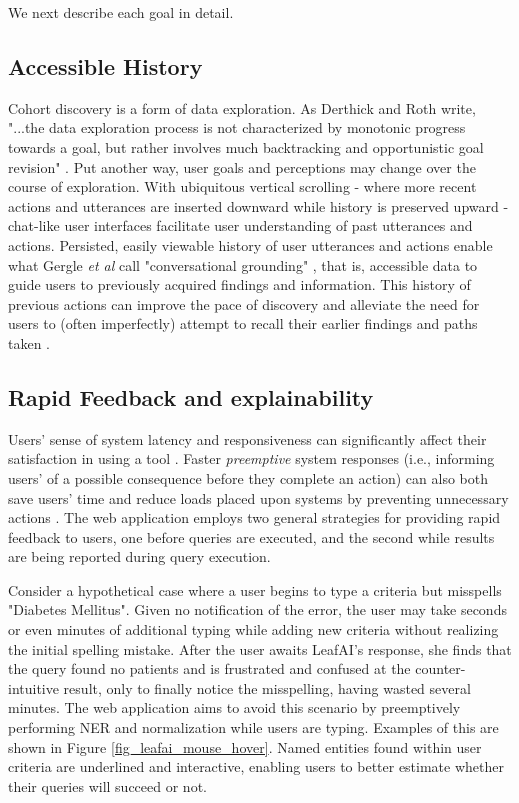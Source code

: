 \documentclass[../main.tex]{subfiles}
\begin{document}
\noindent We next describe each goal in detail.

\subsection{Accessible History} 

Cohort discovery is a form of data exploration. As Derthick and Roth write, "...the data exploration process is not characterized by monotonic progress towards a goal, but rather involves much backtracking and opportunistic goal revision" \cite{derthick2001enhancing}. Put another way, user goals and perceptions may change over the course of exploration. With ubiquitous vertical scrolling - where more recent actions and utterances are inserted downward while history is preserved upward - chat-like user interfaces facilitate user understanding of past utterances and actions. Persisted, easily viewable history of user utterances and actions enable what Gergle \textit{et al} call "conversational grounding" \cite{gergle2004persistence}, that is, accessible data to guide users to previously acquired findings and information. This history of previous actions can improve the pace of discovery and alleviate the need for users to (often imperfectly) attempt to recall their earlier findings and paths taken \cite{hill1994history, gergle2004persistence}.

\subsection{Rapid Feedback and explainability}

Users' sense of system latency and responsiveness can significantly affect their satisfaction in using a tool \cite{li2019effects, arapakis2014impact, shneiderman1984response}. Faster \textit{preemptive} system responses (i.e., informing users' of a possible consequence before they complete an action) can also both save users' time and reduce loads placed upon systems by preventing unnecessary actions \cite{lempel2003predictive, diaz2016search}. The web application employs two general strategies for providing rapid feedback to users, one before queries are executed, and the second while results are being reported during query execution.

Consider a hypothetical case where a user begins to type a criteria but misspells "Diabetes Mellitus". Given no notification of the error, the user may take seconds or even minutes of additional typing while adding new criteria without realizing the initial spelling mistake. After the user awaits LeafAI's response, she finds that the query found no patients and is frustrated and confused at the counter-intuitive result, only to finally notice the misspelling, having wasted several minutes. The web application aims to avoid this scenario by preemptively performing NER and normalization while users are typing. Examples of this are shown in Figure \ref{fig_leafai_mouse_hover}. Named entities found within user criteria are underlined and interactive, enabling users to better estimate whether their queries will succeed or not.
\end{document}
